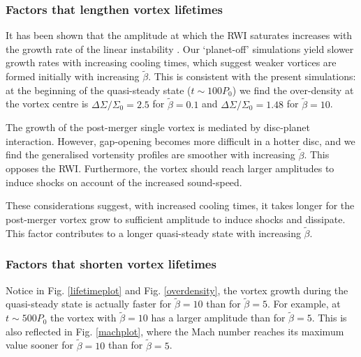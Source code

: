 \subsubsection{Factors that lengthen vortex lifetimes}
It has been shown that the amplitude at which the RWI saturates 
increases with the growth rate of the linear instability  
\citep{meheut2013}. Our `planet-off' simulations yield slower growth
rates with increasing cooling times, which suggest weaker vortices are
formed initially with increasing $\tilde{\beta}$. This is consistent
with the present simulations: at the beginning of the 
quasi-steady  state ($t\sim100P_0$) we find the over-density at the
vortex centre is $\Delta\Sigma/\Sigma_0=2.5$ for $\tilde\beta=0.1$ and
$\Delta\Sigma/\Sigma_0=1.48$ for $\tilde\beta=10$.%

The growth of the post-merger single vortex is mediated by disc-planet
interaction. However, gap-opening becomes more difficult in a hotter 
disc, and we find the generalised vortensity 
profiles are smoother with increasing $\tilde{\beta}$. This opposes
the RWI. 
Furthermore, the vortex should reach larger amplitudes to induce
shocks on account of the increased sound-speed.  

These considerations suggest, with increased cooling times, 
it takes longer for the post-merger vortex grow to sufficient
amplitude to induce shocks and dissipate. This factor contributes to a
longer quasi-steady state with increasing $\tilde{\beta}$.       


\subsubsection{Factors that shorten vortex lifetimes} 
Notice in Fig. \ref{lifetimeplot} and Fig. \ref{overdensity}, the vortex 
growth during the quasi-steady state is actually faster for $\tilde{\beta}=10$
than for $\tilde{\beta}=5$. 
For example, at $t\sim 500P_0$ the vortex with    
$\tilde{\beta}=10$ has a larger 
amplitude than for $\tilde{\beta}=5$. This is also reflected in Fig. \ref{machplot}, where the
Mach number reaches its maximum value sooner for $\tilde{\beta}=10$
than for $\tilde{\beta}=5$.  

